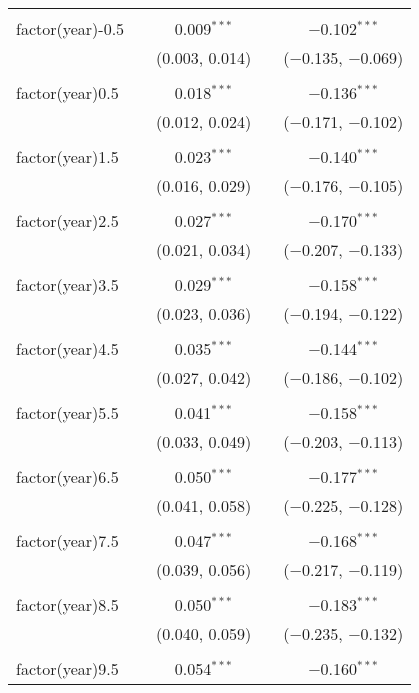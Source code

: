 \begin{table}[!htbp]
\begin{tabular}{@{\extracolsep{5pt}}lcccc}
  & & & & \\ 
 factor(year)-0.5 &  & 0.009$^{***}$ &  & $-$0.102$^{***}$ \\ 
  &  & (0.003, 0.014) &  & ($-$0.135, $-$0.069) \\ 
  & & & & \\ 
 factor(year)0.5 &  & 0.018$^{***}$ &  & $-$0.136$^{***}$ \\ 
  &  & (0.012, 0.024) &  & ($-$0.171, $-$0.102) \\ 
  & & & & \\ 
 factor(year)1.5 &  & 0.023$^{***}$ &  & $-$0.140$^{***}$ \\ 
  &  & (0.016, 0.029) &  & ($-$0.176, $-$0.105) \\ 
  & & & & \\ 
 factor(year)2.5 &  & 0.027$^{***}$ &  & $-$0.170$^{***}$ \\ 
  &  & (0.021, 0.034) &  & ($-$0.207, $-$0.133) \\ 
  & & & & \\ 
 factor(year)3.5 &  & 0.029$^{***}$ &  & $-$0.158$^{***}$ \\ 
  &  & (0.023, 0.036) &  & ($-$0.194, $-$0.122) \\ 
  & & & & \\ 
 factor(year)4.5 &  & 0.035$^{***}$ &  & $-$0.144$^{***}$ \\ 
  &  & (0.027, 0.042) &  & ($-$0.186, $-$0.102) \\ 
  & & & & \\ 
 factor(year)5.5 &  & 0.041$^{***}$ &  & $-$0.158$^{***}$ \\ 
  &  & (0.033, 0.049) &  & ($-$0.203, $-$0.113) \\ 
  & & & & \\ 
 factor(year)6.5 &  & 0.050$^{***}$ &  & $-$0.177$^{***}$ \\ 
  &  & (0.041, 0.058) &  & ($-$0.225, $-$0.128) \\ 
  & & & & \\ 
 factor(year)7.5 &  & 0.047$^{***}$ &  & $-$0.168$^{***}$ \\ 
  &  & (0.039, 0.056) &  & ($-$0.217, $-$0.119) \\ 
  & & & & \\ 
 factor(year)8.5 &  & 0.050$^{***}$ &  & $-$0.183$^{***}$ \\ 
  &  & (0.040, 0.059) &  & ($-$0.235, $-$0.132) \\ 
  & & & & \\ 
 factor(year)9.5 &  & 0.054$^{***}$ &  & $-$0.160$^{***}$ \\ 

\end{tabular}
\end{table}
